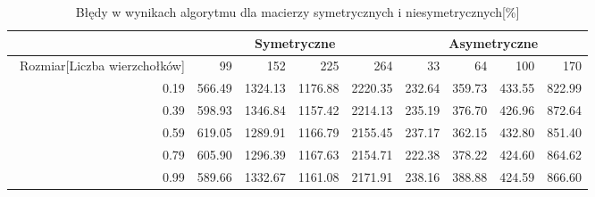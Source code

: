 \begin{table}
\begin{tabular}{|r|r|r|r|r|r|r|r|r|}
\hline
 & \multicolumn{4}{|c|}{Symetryczne} & \multicolumn{4}{|c|}{Asymetryczne} \\ \hline\
Rozmiar[Liczba wierzchołków] & 99 & 152 & 225 & 264 & 33 & 64 & 100 & 170 \\ \hline
0.19 & 566.49 & 1324.13 & 1176.88 & 2220.35 & 232.64 & 359.73 & 433.55 & 822.99 \\
0.39 & 598.93 & 1346.84 & 1157.42 & 2214.13 & 235.19 & 376.70 & 426.96 & 872.64 \\
0.59 & 619.05 & 1289.91 & 1166.79 & 2155.45 & 237.17 & 362.15 & 432.80 & 851.40 \\
0.79 & 605.90 & 1296.39 & 1167.63 & 2154.71 & 222.38 & 378.22 & 424.60 & 864.62 \\
0.99 & 589.66 & 1332.67 & 1161.08 & 2171.91 & 238.16 & 388.88 & 424.59 & 866.60 \\ \hline
\end{tabular}
\caption{Błędy w wynikach algorytmu dla macierzy symetrycznych i niesymetrycznych[\%]}
\label{tab:error_AnAlpha}
\end{table}
